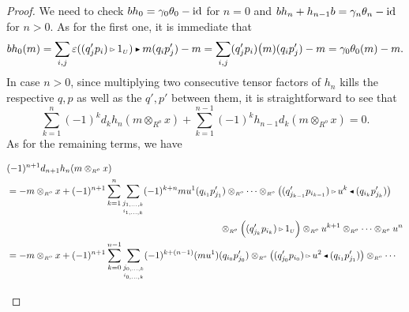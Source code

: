 \documentclass[reqno, a4paper, 10pt]{amsart}
\numberwithin{equation}{section}
\theoremstyle{plain}
\theoremstyle{definition}
\theoremstyle{remark}
\begin{document}
\begin{proof}
We need to check $bh_0 = \gamma_0 \theta_0 - {{\rm id}}$ for $n=0$ and $bh_n + h_{n-1}b = \gamma_n \theta_n - {{\rm id}}$ for $n > 0$. 
As for the first one, it is immediate that
\begin{equation*}
b h_0(m) = \sum_{i,j} \varepsilon((q'_jp_i) {{\,\raise1pt\hbox{$\scriptscriptstyle{\rhd}$} \, }} 1_{{\scriptscriptstyle{U}}}) {{\,\raise1pt\hbox{$\scriptscriptstyle{\blacktriangleright}$} \, }} m(q_ip'_j) - m \\
= \sum_{i, j} (q'_jp_i)\big(m) (q_ip'_j) - m
= \gamma_0 \theta_0(m) - m.
\end{equation*}
In case $n > 0$, since multiplying two consecutive tensor factors of $h_n$ kills the respective $q, p$ as well as the $q', p'$ 
between them, 
it is
straightforward to see that 
\begin{equation}
\label{ronda}
\sum_{k=1}^n (-1)^k d_k h_n(m \otimes_{{\scriptscriptstyle{{R^{o}}}}} x) + \sum_{k=1}^{n-1} (-1)^k h_{n-1} d_k (m \otimes_{{\scriptscriptstyle{{R^{o}}}}} x) =0. 
\end{equation}
As for the remaining terms, we have
\begin{footnotesize}
\begin{equation*}
\begin{split}
&(-1)^{n+1} d_{n+1}   h_n(m \otimes_{{\scriptscriptstyle{{R^{o}}}}} x) \\ 
&= - m \otimes_{{\scriptscriptstyle{{R^{o}}}}} x 
+  (-1)^{n+1} \sum^n_{k=1} \underset{\underset{i_{1, \ldots, k}}{j_{1,\ldots, k}}}{\sum} (-1)^{k+n} mu^1(q_{i_1}p'_{j_1}) 
\otimes_{{\scriptscriptstyle{{R^{o}}}}}  \cdots  \otimes_{{\scriptscriptstyle{{R^{o}}}}}{\big( { (q'_{j_{k-1}}p_{i_{k-1}}) {{\,\raise1pt\hbox{$\scriptscriptstyle{\rhd}$} \, }} u^k {{\,\raise1pt\hbox{$\scriptscriptstyle{\blacktriangleleft}$} \, }}   (q_{i_k}p'_{j_k}) } \big)} \\
& \hspace*{8cm} \otimes_{{\scriptscriptstyle{{R^{o}}}}}  \Big( (q'_{j_k}p_{i_k})  {{\,\raise1pt\hbox{$\scriptscriptstyle{\rhd}$} \, }} 1_{{\scriptscriptstyle{U}}} \Big) \otimes_{{\scriptscriptstyle{{R^{o}}}}} u^{k+1} \otimes_{{\scriptscriptstyle{{R^{o}}}}} \cdots \otimes_{{\scriptscriptstyle{{R^{o}}}}} u^n \\
& = - m \otimes_{{\scriptscriptstyle{{R^{o}}}}} x 
+  (-1)^{n+1} \sum^{n-1}_{k=0} \underset{\underset{i_{0, \ldots, k}}{j_{0,\ldots, k}}}{\sum} (-1)^{k+(n-1)} (mu^1)(q_{i_0}p'_{j_0}) 
\otimes_{{\scriptscriptstyle{{R^{o}}}}}  {\big( { (q'_{j_{0}}p_{i_{0}}) {{\,\raise1pt\hbox{$\scriptscriptstyle{\rhd}$} \, }} u^{2} {{\,\raise1pt\hbox{$\scriptscriptstyle{\blacktriangleleft}$} \, }}   (q_{i_1}p'_{j_1}) } \big)} \otimes_{{\scriptscriptstyle{{R^{o}}}}}  \cdots \\

\end{split}
\end{equation*}
\end{footnotesize}
\end{proof}
\end{document}
